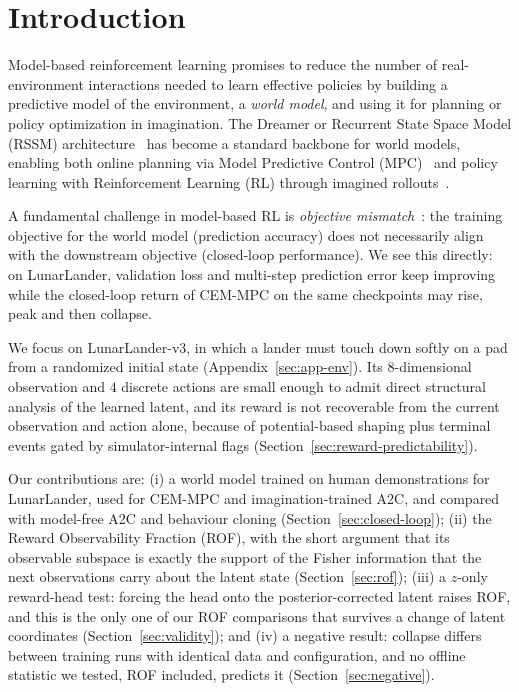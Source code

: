 \documentclass[11pt]{article}
\theoremstyle{remark}
\begin{document}
\section{Introduction}
\label{sec:intro}

Model-based reinforcement learning promises to reduce
the number of real-environment interactions needed to learn effective policies
by building a predictive model of the environment, a \emph{world model}, and
using it for planning or policy optimization in imagination.
The Dreamer or Recurrent State Space Model (RSSM) architecture~\cite{hafner2019planet,hafner2020dreamer}
has become a standard backbone for world models, enabling both online planning via Model Predictive Control (MPC)~\cite{hafner2019planet} and policy learning with Reinforcement Learning (RL) through imagined rollouts~\cite{hafner2020dreamer,hafner2023dreamerv3}.

A fundamental challenge in model-based RL is
\emph{objective mismatch}~\cite{lambert2020objective}:
the training objective for the world model (prediction accuracy) does not
necessarily align with the downstream objective (closed-loop performance).
We see this directly: on LunarLander, validation loss and multi-step prediction error keep improving while the closed-loop return of CEM-MPC on the same checkpoints may rise, peak and then collapse.

We focus on LunarLander-v3, in which a lander must touch down softly on a pad from a randomized initial state (Appendix~\ref{sec:app-env}). Its $8$-dimensional observation and $4$ discrete actions are small enough to admit direct structural analysis of the learned latent, and its reward is not recoverable from the current observation and action alone, because of potential-based shaping plus terminal events gated by simulator-internal flags (Section~\ref{sec:reward-predictability}).

Our contributions are: (i) a world model trained on human demonstrations for LunarLander, used for CEM-MPC and imagination-trained A2C, and compared with model-free A2C and behaviour cloning (Section~\ref{sec:closed-loop}); (ii) the Reward Observability Fraction (ROF), with the short argument that its observable subspace is exactly the support of the Fisher information that the next observations carry about the latent state (Section~\ref{sec:rof}); (iii) a $z$-only reward-head test: forcing the head onto the posterior-corrected latent raises ROF, and this is the only one of our ROF comparisons that survives a change of latent coordinates (Section~\ref{sec:validity}); and (iv) a negative result: collapse differs between training runs with identical data and configuration, and no offline statistic we tested, ROF included, predicts it (Section~\ref{sec:negative}).
\end{document}
